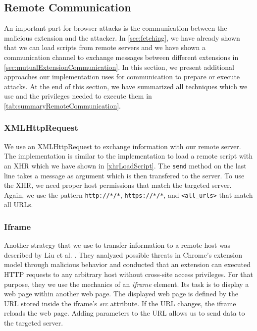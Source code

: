 \subsection{Remote Communication}

	An important part for browser attacks is the communication between the malicious extension and the attacker. In \autoref{sec:fetching}, we have already shown that we can load scripts from remote servers and we have shown a communication channel to exchange messages between different extensions in \autoref{sec:mutualExtensionCommunication}. In this section, we present additional approaches our implementation uses for communication to prepare or execute attacks. At the end of this section, we have summarized all techniques which we use and the privileges needed to execute them in \autoref{tab:summaryRemoteCommunication}.
	
\subsubsection{XMLHttpRequest}
	
	We use an XMLHttpRequest to exchange information with our remote server. The implementation is similar to the implementation to load a remote script with an XHR which we have shown in \autoref{xhrLoadScript}. The \texttt{send} method on the last line takes a message as argument which is then transfered to the server. To use the XHR, we need proper host permissions that match the targeted server. Again, we use the pattern \texttt{http://*/*}, \texttt{https://*/*}, and \texttt{<all\_urls>} that match all URLs.

\subsubsection{Iframe}
	
	Another strategy that we use to transfer information to a remote host was described by Liu et al. \cite{Liu12chromeextensions:}. They analyzed possible threats in Chrome's extension model through malicious behavior and conducted that an extension can executed HTTP requests to any arbitrary host without cross-site access privileges. For that purpose, they we use the mechanics of an \textit{iframe} element. Its task is to display a web page within another web page. The displayed web page is defined by the URL stored inside the iframe's \textit{src} attribute. If the URL changes, the iframe reloads the web page. Adding parameters to the URL allows us to send data to the targeted server. 
	
